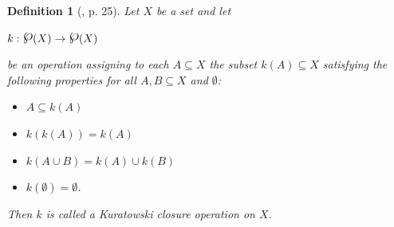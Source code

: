 \documentclass[12pt, oneside]{book}
\newtheorem{definition}[theorem]{Definition}
\newcommand{\powerset}{\raisebox{.15\baselineskip}{\Large\ensuremath{\wp}}}
\begin{document}
\begin{definition} [\cite{W2}, p. 25] \label{defnKuratowski}
\normalfont
\noindent Let $X$ be a set and let
\begin{center}
$k:\powerset(X) \rightarrow \powerset(X)$ 
\end{center}
be an operation assigning to each $A \subseteq X$ the subset $k(A) \subseteq X$ satisfying the 
following properties for all $A,B \subseteq X$ and $\emptyset$:

\begin{itemize}
\item [K1.] \quad $A \subseteq k(A)$ 
\item [K2.] \quad $k(k(A))=k(A)$  
\item [K3.] \quad $k(A \cup B) = k(A) \cup k(B)$ 
\item [K4.] \quad $k(\emptyset)=\emptyset$.
\end{itemize}

\noindent Then $k$ is called a {\sl Kuratowski closure operation} on $X$.

\end{definition}
\end{document}

